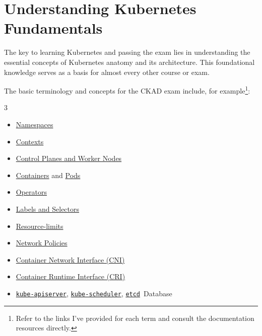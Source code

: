 \section{Understanding Kubernetes Fundamentals}

The key to learning Kubernetes and passing the exam lies in understanding the essential concepts of Kubernetes anatomy and its architecture. This foundational knowledge serves as a basis for almost every other course or exam.

\noindent The basic terminology and concepts for the CKAD exam include, for example\footnote{Refer to the links I've provided for each term and consult the documentation resources directly.}:

\noindent{}
\begin{multicols}{3}
\begin{itemize}
    \item \href{https://kubernetes.io/docs/concepts/overview/working-with-objects/namespaces/}{Namespaces}
    \item \href{https://kubernetes.io/docs/reference/kubectl/generated/kubectl_config/kubectl_config_use-context/}{Contexts}
    \item \href{https://kubernetes.io/docs/concepts/overview/components/}{Control Planes and Worker Nodes}
    \item \href{https://kubernetes.io/docs/concepts/containers/}{Containers} and \href{https://kubernetes.io/docs/concepts/workloads/pods/}{Pods}
    \item \href{https://kubernetes.io/docs/concepts/scheduling-eviction/assign-pod-node/#operators}{Operators}
    \item \href{https://kubernetes.io/docs/concepts/overview/working-with-objects/labels/}{Labels and Selectors}
    \item \href{https://kubernetes.io/docs/concepts/configuration/manage-resources-containers/}{Resource-limits}
    \item \href{https://kubernetes.io/docs/concepts/services-networking/network-policies/}{Network Policies}
    \item \href{https://kubernetes.io/docs/concepts/extend-kubernetes/compute-storage-net/network-plugins/}{Container Network Interface (CNI)}
    \item \href{https://kubernetes.io/docs/concepts/architecture/cri/}{Container Runtime Interface (CRI)}
    \item \href{https://kubernetes.io/docs/concepts/architecture/#kube-apiserver}{\texttt{kube-apiserver}}, \href{https://kubernetes.io/docs/concepts/architecture/#kube-scheduler}{\texttt{kube-scheduler}}, \href{https://kubernetes.io/docs/concepts/architecture/#kube-scheduler}{\texttt{etcd}}~Database

\end{itemize}
\end{multicols}
